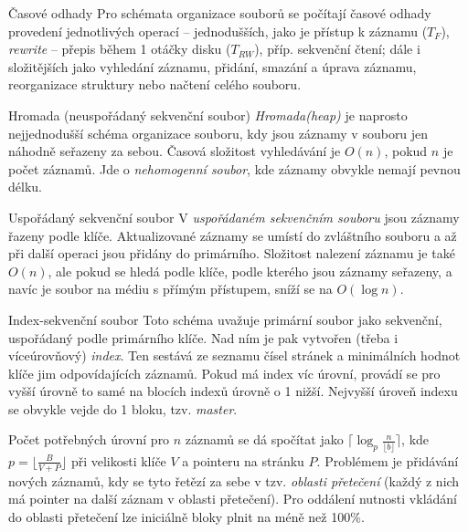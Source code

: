 \begin{poznamkaN}{Časové odhady}
Pro schémata organizace souborů se počítají časové odhady provedení jednotlivých operací -- jednodušších, jako je přístup k záznamu ($T_F$), \emph{rewrite} -- přepis během 1 otáčky disku ($T_{RW}$), příp. sekvenční čtení; dále i složitějších jako vyhledání záznamu, přidání, smazání a úprava záznamu, reorganizace struktury nebo načtení celého souboru.
\end{poznamkaN}

\begin{obecne}{Hromada (neuspořádaný sekvenční soubor)}
\emph{Hromada(heap)} je naprosto nejjednodušší schéma organizace souboru, kdy jsou záznamy v souboru jen náhodně seřazeny za sebou. Časová složitost vyhledávání je $O(n)$, pokud $n$ je počet záznamů. Jde o \emph{nehomogenní soubor}, kde záznamy obvykle nemají pevnou délku. 
\end{obecne}

\begin{obecne}{Uspořádaný sekvenční soubor}
V \emph{uspořádaném sekvenčním souboru} jsou záznamy řazeny podle klíče. Aktualizované záznamy se umístí do zvláštního souboru a až při další operaci  jsou přidány do primárního. Složitost nalezení záznamu je také $O(n)$, ale pokud se hledá podle klíče, podle kterého jsou záznamy seřazeny, a navíc je soubor na médiu s přímým přístupem, sníží se na $O(\log n)$.
\end{obecne}

\begin{obecne}{Index-sekvenční soubor}
Toto schéma uvažuje primární soubor jako sekvenční, uspořádaný podle primárního klíče. Nad ním je pak vytvořen (třeba i víceúrovňový) \emph{index}. Ten sestává ze seznamu čísel stránek a minimálních hodnot klíče jim odpovídajících záznamů. Pokud má index víc úrovní, provádí se pro vyšší úrovně to samé na blocích indexů úrovně o 1 nižší. Nejvyšší úroveň indexu se obvykle vejde do 1 bloku, tzv. \emph{master}. 

Počet potřebných úrovní pro $n$ záznamů se dá spočítat jako $\lceil\log_p\frac{n}{\lfloor b\rfloor}\rceil$, kde $p=\lfloor\frac{B}{V+P}\rfloor$ při velikosti klíče $V$ a pointeru na stránku $P$. Problémem je přidávání nových záznamů, kdy se tyto řetězí za sebe v tzv. \emph{oblasti přetečení} (každý z nich má pointer na další záznam v oblasti přetečení). Pro oddálení nutnosti vkládání do oblasti přetečení lze iniciálně bloky plnit na méně než 100\%.
\end{obecne}


